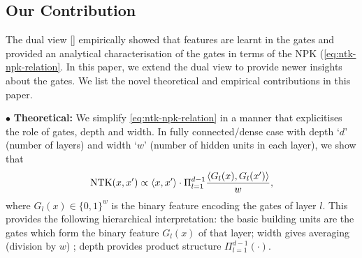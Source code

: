 \begin{comment}
\begin{center}
\emph{Duality: DNNs with ReLU are layers as well as paths}
\end{center}
The standard primal way of expressing information processing is layer by layer. In the dual view, the DNN is broken into paths. A path comprises of gates and weights, and a path is `active' or `on' only if all the gates in the path are `on'. The output is the sum of the contribution of the individual paths. 
\begin{center}
\emph{Most information (i.e., features) is in the gates and gates are learnt during training}
\end{center}
The gates are treated as masks and are decoupled from the weights by storing the gates and weights in two separate networks (see \Cref{sec:dgn}). Now, the information in the gates can be measured by fixing the gates and training the weights. It was shown that (i) when the gates from a trained DNN are used as masks, and the weights are trained from scratch, there is no significant loss in test performance, i.e., \textbf{features are stored in the gates} and (ii) gates of a trained network perform better than $\text{NTK}_{\infty}$ and gates from a untrained network performs poorly than $\text{NTK}_{\infty}$, i.e., \textbf{learning in the gates explains the difference between finite vs infinite} width DNNs with ReLUs.
\begin{center}
\emph{NTK is interpretable in terms of active sub-networks}
\end{center}
\end{comment}


\subsection{Our Contribution}
The dual view [] empirically showed that features are learnt in the gates and provided an analytical characterisation of the gates in terms of the NPK (\eqref{eq:ntk-npk-relation}. In this paper, we extend the dual view to provide newer insights about the gates.  We list the novel theoretical and empirical contributions in this paper. 

$\bullet$ \textbf{Theoretical:} We simplify \eqref{eq:ntk-npk-relation} in a manner that explicitises the role of gates, depth and width. In fully connected/dense case with depth `$d$' (number of layers) and width `$w$' (number of hidden units in each layer), we show that
\begin{align}\label{eq:main}
\text{NTK}(x,x') \propto \langle x,x'\rangle\cdot \Pi_{l=1}^{d-1} \frac{\langle G_l(x),G_l(x')\rangle}w, 
 \end{align}
where $G_l(x)\in\{0,1\}^w$ is the binary feature encoding the gates of layer $l$. This provides the following hierarchical interpretation: the basic building units are the gates which form the binary feature $G_l(x)$ of that layer; width gives averaging (division by $w$) ; depth provides product structure $\Pi_{l=1}^{d-1} (\cdot)$.

